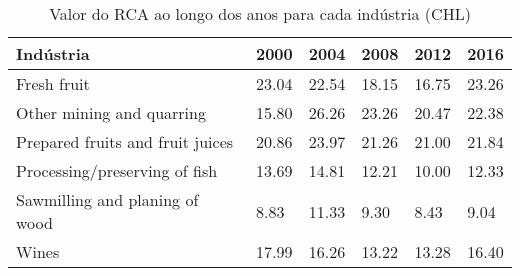 \begin{table}
\centering
\caption{Valor do RCA ao longo dos anos para cada indústria (CHL)}
\begin{tabular}{p{6cm}p{1.5cm}p{1.5cm}p{1.5cm}p{1.5cm}p{1.5cm}}
\toprule
                       Indústria &  2000 &  2004 &  2008 &  2012 &  2016 \\
\midrule
                     Fresh fruit & 23.04 & 22.54 & 18.15 & 16.75 & 23.26 \\
       Other mining and quarring & 15.80 & 26.26 & 23.26 & 20.47 & 22.38 \\
Prepared fruits and fruit juices & 20.86 & 23.97 & 21.26 & 21.00 & 21.84 \\
   Processing/preserving of fish & 13.69 & 14.81 & 12.21 & 10.00 & 12.33 \\
  Sawmilling and planing of wood &  8.83 & 11.33 &  9.30 &  8.43 &  9.04 \\
                           Wines & 17.99 & 16.26 & 13.22 & 13.28 & 16.40 \\
\bottomrule
\end{tabular}
\end{table}
